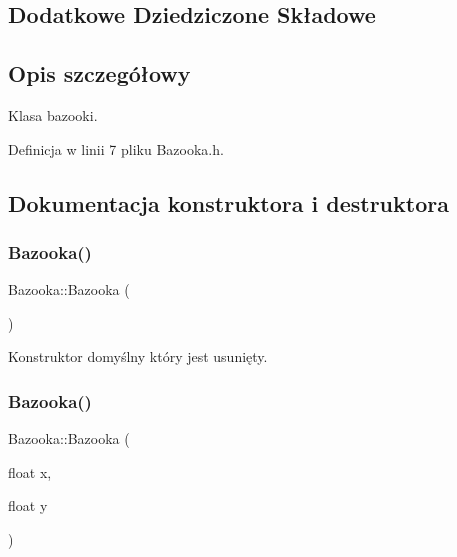 \subsection*{Dodatkowe Dziedziczone Składowe}


\subsection{Opis szczegółowy}
Klasa bazooki. 

Definicja w linii 7 pliku Bazooka.\+h.



\subsection{Dokumentacja konstruktora i destruktora}
\mbox{\label{class_bazooka_ab95ef6e55a5d1a7748df7287b562002b}} 
\subsubsection{\texorpdfstring{Bazooka()}{Bazooka()}\hspace{0.1cm}{\footnotesize\ttfamily [1/2]}}
{\footnotesize\ttfamily Bazooka\+::\+Bazooka (\begin{DoxyParamCaption}{ }\end{DoxyParamCaption})\hspace{0.3cm}{\ttfamily [delete]}}



Konstruktor domyślny który jest usunięty. 

\mbox{\label{class_bazooka_aa3a6371f52b0649a6789401b8a11e8bd}} 
\subsubsection{\texorpdfstring{Bazooka()}{Bazooka()}\hspace{0.1cm}{\footnotesize\ttfamily [2/2]}}
{\footnotesize\ttfamily Bazooka\+::\+Bazooka (\begin{DoxyParamCaption}\item[{float}]{x,  }\item[{float}]{y }\end{DoxyParamCaption})}



